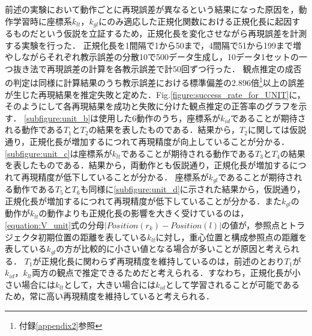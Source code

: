 前述の実験において動作ごとに再現誤差が異なるという結果になった原因を，動作学習時に座標系$k_{lt}$，$k_{gl}$にのみ適応した正規化関数における正規化長に起因するものだという仮説を立証するため，正規化長を変化させながら再現誤差を計測する実験を行った．
正規化長を1間隔で1から50まで，4間隔で51から199まで増やしながらそれぞれ教示誤差の分散10で500データ生成し，10データ1セットの一つ抜き法で再現誤差の計算を各教示誤差で計50回ずつ行った．
観点推定の成否の判定は同様に計算結果のうち教示誤差における標準偏差の2.896倍\footnote{付録\ref{appendix2}参照}以上の誤差が生じた再現結果を推定失敗と定めた．Fig.\ref{figure:success_rate_for_UNIT}に，そのようにして各再現結果を成功と失敗に分けた観点推定の正答率のグラフを示す．
\ref{subfigure:unit_b}は使用した6動作のうち，座標系が$k_{id}$であることが期待される動作である$T_{1}$と$T_{2}$の結果を表したものである．結果から，$T_{2}$に関しては仮説通り，正規化長が増加するにつれて再現精度が向上していることが分かる．
\ref{subfigure:unit_c}は座標系が$k_{lt}$であることが期待される動作である$T_{3}$と$T_{4}$の結果を表したものである．結果から，両動作とも仮説通り，正規化長が増加するにつれて再現精度が低下していることが分かる．
座標系が$k_{gl}$であることが期待される動作である$T_{5}$と$T_{6}$も同様に\ref{subfigure:unit_d}に示された結果から，仮説通り，正規化長が増加するにつれて再現精度が低下していることが分かる．また$k_{gl}$の動作が$k_{lt}$の動作よりも正規化長の影響を大きく受けているのは，\ref{equation:V_unit}式の分母$| Position(r_{k})-Position(l) |$の値が，参照点とトラジェクタ初期位置の距離を表している$k_{lt}$に対し，重心位置と構成参照点の距離を表している$k_{gl}$の方が比較的に小さい値となる場合が多いことが原因と考えられる．
$T_{1}$が正規化長に関わらず再現精度を維持しているのは，前述のとおり$T_{1}$が$k_{id}$，$k_{lt}$両方の観点で推定できるためだと考えられる．すなわち，正規化長が小さい場合には$k_{lt}$として，大きい場合には$k_{id}$として学習されることが可能であるため，常に高い再現精度を維持していると考えられる．

